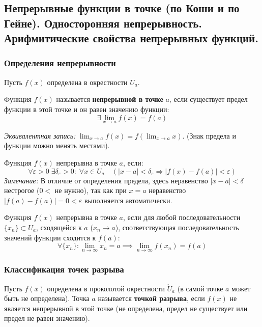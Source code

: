 \subsection{Непрерывные функции в точке (по Коши и по Гейне). Односторонняя непрерывность. Арифмитические свойства непрерывных функций.}

\subsubsection*{Определения непрерывности}

Пусть $f(x)$ определена в окрестности $U_a$.

\begin{tcolorbox}[title=Определение (через пределы)]
	Функция $f(x)$ называется \textbf{непрерывной в точке} $a$, если существует предел функции в этой точке и он равен значению функции:
	\[ \exists \lim_{x\to a} f(x) = f(a) \]
	
	\textit{Эквивалентная запись:} $\lim_{x\to a} f(x) = f(\lim_{x\to a} x)$. (Знак предела и функции можно менять местами).
\end{tcolorbox}

\begin{tcolorbox}[title=Определение по Коши ($\varepsilon - \delta$)]
	Функция $f(x)$ непрерывна в точке $a$, если:
	\[ \forall \varepsilon > 0\; \exists \delta_\varepsilon > 0:\; \forall x \in U_a \quad (|x - a| < \delta_\varepsilon \Rightarrow |f(x) - f(a)| < \varepsilon) \]
	\textit{Замечание:} В отличие от определения предела, здесь неравенство $|x-a| < \delta$ нестрогое ($0 <$ не нужно), так как при $x=a$ неравенство $|f(a)-f(a)|=0 < \varepsilon$ выполняется автоматически.
\end{tcolorbox}

\begin{tcolorbox}[title=Определение по Гейне (на языке последовательностей)]
	Функция $f(x)$ непрерывна в точке $a$, если для любой последовательности $\{x_n\} \subset U_a$, сходящейся к $a$ ($x_n \to a$), соответствующая последовательность значений функции сходится к $f(a)$:
	\[ \forall \{x_n\}: \lim_{n\to\infty} x_n = a \implies \lim_{n\to\infty} f(x_n) = f(a) \]
\end{tcolorbox}

\subsubsection*{Классификация точек разрыва}

Пусть $f(x)$ определена в проколотой окрестности $\mathring{U}_a$ (в самой точке $a$ может быть не определена).
Точка $a$ называется \textbf{точкой разрыва}, если $f(x)$ не является непрерывной в этой точке (не определена, предел не существует или предел не равен значению).

